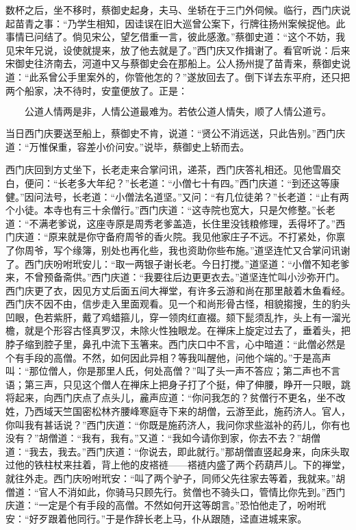 数杯之后，坐不移时，蔡御史起身，夫马、坐轿在于三门外伺候。临行，西门庆说起苗青之事：“乃学生相知，因诖误在旧大巡曾公案下，行牌往扬州案候捉他。此事情已问结了。倘见宋公，望乞借重一言，彼此感激。”蔡御史道：“这个不妨，我见宋年兄说，设使就提来，放了他去就是了。”西门庆又作揖谢了。看官听说：后来宋御史往济南去，河道中又与蔡御史会在那船上。公人扬州提了苗青来，蔡御史说道：“此系曾公手里案外的，你管他怎的？”遂放回去了。倒下详去东平府，还只把两个船家，决不待时，安童便放了。正是：

\[
公道人情两是非，人情公道最难为。
若依公道人情失，顺了人情公道亏。
\]

当日西门庆要送至船上，蔡御史不肯，说道：“贤公不消远送，只此告别。”西门庆道：“万惟保重，容差小价问安。”说毕，蔡御史上轿而去。

西门庆回到方丈坐下，长老走来合掌问讯，递茶，西门庆答礼相还。见他雪眉交白，便问：“长老多大年纪？”长老道：“小僧七十有四。”西门庆道：“到还这等康健。”因问法号，长老道：“小僧法名道坚。”又问：“有几位徒弟？”长老道：“止有两个小徒。本寺也有三十余僧行。”西门庆道：“这寺院也宽大，只是欠修整。”长老道：“不满老爹说，这座寺原是周秀老爹盖造，长住里没钱粮修理，丢得坏了。”西门庆道：“原来就是你守备府周爷的香火院。我见他家庄子不远。不打紧处，你禀了你周爷，写个缘簿，别处也再化些，我也资助你些布施。”道坚连忙又合掌问讯谢了。西门庆吩咐玳安儿：“取一两银子谢长老。今日打搅。”道坚道：“小僧不知老爹来，不曾预备斋供。”西门庆道：“我要往后边更更衣去。”道坚连忙叫小沙弥开门。西门庆更了衣，因见方丈后面五间大禅堂，有许多云游和尚在那里敲着木鱼看经。西门庆不因不由，信步走入里面观看。见一个和尚形骨古怪，相貌搊搜，生的豹头凹眼，色若紫肝，戴了鸡蜡箍儿，穿一领肉红直裰。颏下髭须乱拃，头上有一溜光檐，就是个形容古怪真罗汉，未除火性独眼龙。在禅床上旋定过去了，垂着头，把脖子缩到腔子里，鼻孔中流下玉箸来。西门庆口中不言，心中暗道：“此僧必然是个有手段的高僧。不然，如何因此异相？等我叫醒他，问他个端的。”于是高声叫：“那位僧人，你是那里人氏，何处高僧？”叫了头一声不答应；第二声也不言语；第三声，只见这个僧人在禅床上把身子打了个挺，伸了伸腰，睁开一只眼，跳将起来，向西门庆点了点头儿，麄声应道：“你问我怎的？贫僧行不更名，坐不改姓，乃西域天竺国密松林齐腰峰寒庭寺下来的胡僧，云游至此，施药济人。官人，你叫我有甚话说？”西门庆道：“你既是施药济人，我问你求些滋补的药儿，你有也没有？”胡僧道：“我有，我有。”又道：“我如今请你到家，你去不去？”胡僧道：“我去，我去。”西门庆道：“你说去，即此就行。”那胡僧直竖起身来，向床头取过他的铁柱杖来拄着，背上他的皮褡裢——褡裢内盛了两个药葫芦儿。下的禅堂，就往外走。西门庆吩咐玳安：“叫了两个驴子，同师父先往家去等着，我就来。”胡僧道：“官人不消如此，你骑马只顾先行。贫僧也不骑头口，管情比你先到。”西门庆道：“一定是个有手段的高僧。不然如何开这等朗言。”恐怕他走了，吩咐玳安：“好歹跟着他同行。”于是作辞长老上马，仆从跟随，迳直进城来家。

